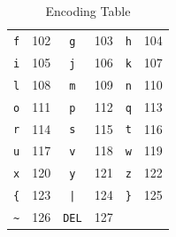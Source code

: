 \begin{table}[!th]
\begin{tabular}{|c|c|c|c|c|c|}
\texttt{f} & 102 & \texttt{g} & 103 & \texttt{h} & 104 \\
\texttt{i} & 105 & \texttt{j} & 106 & \texttt{k} & 107 \\
\texttt{l} & 108 & \texttt{m} & 109 & \texttt{n} & 110 \\
\texttt{o} & 111 & \texttt{p} & 112 & \texttt{q} & 113 \\
\texttt{r} & 114 & \texttt{s} & 115 & \texttt{t} & 116 \\
\texttt{u} & 117 & \texttt{v} & 118 & \texttt{w} & 119 \\
\texttt{x} & 120 & \texttt{y} & 121 & \texttt{z} & 122 \\
\texttt{\{} & 123 & \texttt{|} & 124 & \texttt{\}} & 125 \\
\texttt{\textasciitilde} & 126 & \texttt{DEL} & 127 &  & \\
\hline
\end{tabular}
\caption{ Encoding Table}
\label{tab:ascii_table}
\end{table}
